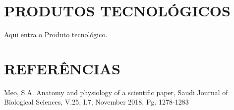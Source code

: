 \documentclass[
12pt,		%
openright,	%
twoside,  %
a4paper,			%
chapter=TITLE,		%
english,			%
french,				%
spanish,			%
brazil				%
]{USPSC-classe/USPSC_RedarTex}
\begin{document}
\chapter[PRODUTOS TECNOL\'OGICOS]{PRODUTOS TECNOL\'OGICOS}\label{PRODUTOS TECNOL\'OGICOS}
Aqui entra o Produto tecnol\'ogico.








\chapter[REFER\^ENCIAS]{REFER\^ENCIAS}\label{REFER\^ENCIAS}
\begin{flushleft}
\begin{flushleft}
\begin{flushleft}
\begin{flushleft}
\begin{flushleft}
\begin{flushleft}
\begin{flushleft}
\begin{flushleft}
[MEO, 2018] Meo, S.A. Anatomy and physiology of a scientific paper, Saudi Journal of Biological Sciences, V.25, I.7, November 2018, Pg. 1278-1283
\end{flushleft}


\end{flushleft}


\end{flushleft}


\end{flushleft}


\end{flushleft}


\end{flushleft}


\end{flushleft}


\end{flushleft}
\end{document}
